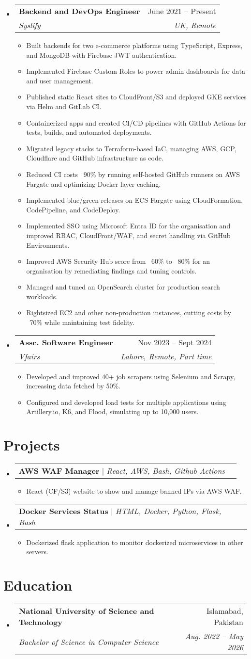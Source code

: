 \documentclass[letterpaper,11pt]{article}
\makeatletter
\newcommand{\resumeItem}[1]{
  \item\small{
    {#1 \vspace{-2pt}}
  }
}
\newcommand{\resumeSubheading}[4]{
  \vspace{-2pt}\item
    \begin{tabular*}{0.97\textwidth}[t]{l@{\extracolsep{\fill}}r}
      \textbf{#1} & #2 \\
      \textit{\small#3} & \textit{\small #4} \\
    \end{tabular*}\vspace{-7pt}
}
\newcommand{\resumeProjectHeading}[2]{
    \item
    \begin{tabular*}{0.97\textwidth}{l@{\extracolsep{\fill}}r}
      \small#1 & #2 \\
    \end{tabular*}\vspace{-7pt}
}
\newcommand{\resumeSubHeadingListStart}{\begin{itemize}[leftmargin=0.15in, label={}]}
\newcommand{\resumeSubHeadingListEnd}{\end{itemize}}
\newcommand{\resumeItemListStart}{\begin{itemize}}
\newcommand{\resumeItemListEnd}{\end{itemize}\vspace{-5pt}}
\makeatother
\begin{document}
  \resumeSubHeadingListStart

    \resumeSubheading
      {Backend and DevOps Engineer}{June 2021 -- Present}
      {Syslify}{UK, Remote}
      \resumeItemListStart
        \resumeItem{Built backends for two e-commerce platforms using TypeScript, Express, and MongoDB with Firebase JWT authentication.}
        \resumeItem{Implemented Firebase Custom Roles to power admin dashboards for data and user management.}
        \resumeItem{Published static React sites to CloudFront/S3 and deployed GKE services via Helm and GitLab CI.}
        \resumeItem{Containerized apps and created CI/CD pipelines with GitHub Actions for tests, builds, and automated deployments.}
        \resumeItem{Migrated legacy stacks to Terraform-based IaC, managing AWS, GCP, Cloudflare and GitHub infrastructure as code.}
        \resumeItem{Reduced CI costs ~90\% by running self-hosted GitHub runners on AWS Fargate and optimizing Docker layer caching.}
        \resumeItem{Implemented blue/green releases on ECS Fargate using CloudFormation, CodePipeline, and CodeDeploy.}
  \resumeItem{Implemented SSO using Microsoft Entra ID for the organisation and improved RBAC, CloudFront/WAF, and secret handling via GitHub Environments.}
  \resumeItem{Improved AWS Security Hub score from ~60\% to ~80\% for an organisation by remediating findings and tuning controls.}
  \resumeItem{Managed and tuned an OpenSearch cluster for production search workloads.}
        \resumeItem{Rightsized EC2 and other non-production instances, cutting costs by ~70\% while maintaining test fidelity.}
      \resumeItemListEnd
  \resumeSubHeadingListEnd
  \resumeSubHeadingListStart

    \resumeSubheading
      {Assc. Software Engineer}{Nov 2023 -- Sept 2024}
      {Vfairs}{Lahore, Remote, Part time}
      \resumeItemListStart
        \resumeItem{Developed and improved 40+ job scrapers using Selenium and Scrapy, increasing data fetched by 50\%.}
                \resumeItem{Configured and developed load tests for multiple applications using Artillery.io, K6, and Flood, simulating up to 10,000 users.}
      \resumeItemListEnd
  \resumeSubHeadingListEnd

\section{Projects}
    \resumeSubHeadingListStart
      \resumeProjectHeading
        {\textbf{AWS WAF Manager} $|$ \emph{React, AWS, Bash, Github Actions}}{}
          \resumeItemListStart
            \resumeItem{React (CF/S3) website to show and manage banned IPs via AWS WAF.}
          \resumeItemListEnd
      \resumeProjectHeading
        {\textbf{Docker Services Status} $|$ \emph{HTML, Docker, Python, Flask, Bash}}{}
          \resumeItemListStart
            \resumeItem{Dockerized flask application to monitor dockerized microservices in other servers.}
          \resumeItemListEnd
    \resumeSubHeadingListEnd

\section{Education}
  \resumeSubHeadingListStart
    \resumeSubheading
      {National University of Science and Technology}{Islamabad, Pakistan}
      {Bachelor of Science in Computer Science}{Aug. 2022 -- May 2026}
  \resumeSubHeadingListEnd
\end{document}

